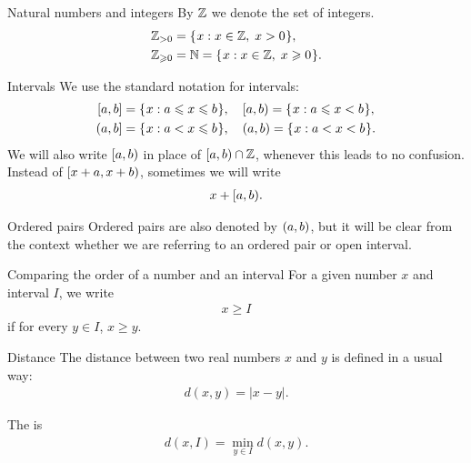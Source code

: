 \documentclass[12pt]{memoir}
\begin{document}
\begin{flushdescription}

\item [Natural numbers and integers] 
By \( \mathbb{Z} \) we denote the set of integers.
\begin{align*}
   \mathbb{Z}_{>0}&=\mathopen\{\mskip 1mu x : x\in \mathbb{Z},\;  x>0\mskip 1mu\mathclose\}, \\
   \mathbb{Z}_{\geqslant 0}&=\mathbb{N}=\mathopen\{\mskip 1mu x : x\in \mathbb{Z},\;  x\geqslant 0\mskip 1mu\mathclose\}.
\end{align*}

\item [Intervals]
We use the standard notation for intervals:
\begin{align*}
   [a,b]&=\mathopen\{\mskip 1mu x : a\leqslant x \leqslant b\mskip 1mu\mathclose\},\quad [a,b)=\mathopen\{\mskip 1mu x : a\leqslant x < b\mskip 1mu\mathclose\}, \\
   (a,b]&=\mathopen\{\mskip 1mu x : a< x \leqslant b\mskip 1mu\mathclose\}, \quad  (a,b)=\mathopen\{\mskip 1mu x : a< x < b\mskip 1mu\mathclose\}.
\end{align*}
We will also write \( [a,b) \) in place of \( [a,b)\cap \mathbb{Z} \), 
whenever this leads to no confusion.
Instead of \( [x+a,x+b) \), sometimes we will write 
\begin{align*}x + [a,b).\end{align*}

\item [Ordered pairs]
Ordered pairs are also denoted by \( (a,b) \),
but it will be clear from the context whether we are
referring to an ordered pair or open interval.

\item [Comparing the order of a number and an interval]
For a given number \( x \) and interval \( I \), we
write
\begin{align*} x \ge I \end{align*}
if for every \( y\in I \),  \( x \ge y \).

\item [Distance]
The distance between two real numbers \( x \) and \( y \) is defined
in a usual way:
\begin{align*}
    d(x,y)= |x-y|.
\end{align*}

The   is
\begin{align*}
    d(x,I)= \min_{y\in I}d(x,y).
\end{align*}


\end{flushdescription}
\end{document}

